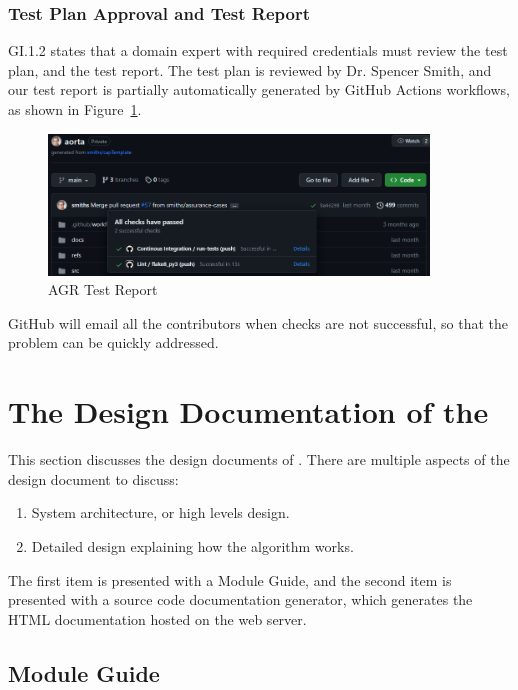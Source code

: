 \subsubsection{Test Plan Approval and Test Report}
GI.1.2 states that a domain expert with required credentials must review the test plan, and the test report. The test plan is reviewed by Dr. Spencer Smith, and our test report is partially automatically generated by GitHub Actions workflows, as shown in Figure~\ref{fig_agr_test_report}.

\begin{figure}[H]
    \centering
    \includegraphics[width=0.9\textwidth]{figures/AC/GI/test_report.png}
    \caption[AGR Test Report]{AGR Test Report}
    \label{fig_agr_test_report}
\end{figure}

GitHub will email all the contributors when checks are not successful, so that the problem can be quickly addressed.

\section{The Design Documentation of the \progname{}}

This section discusses the design documents of \progname{}. There are multiple aspects of the design document to discuss:

\begin{enumerate}
\item System architecture, or high levels design.
\item Detailed design explaining how the algorithm works.
\end{enumerate}

The first item is presented with a Module Guide, and the second item is presented with a source code documentation generator, which generates the HTML documentation hosted on the web server.

\subsection{Module Guide}

